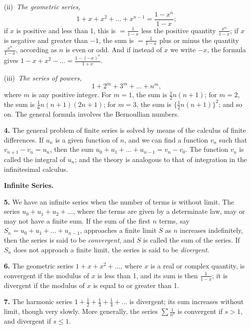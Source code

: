 \documentclass[11pt,a4paper]{book}
\begin{document}
(ii)~\textit{The geometric series,}
\[
1 + x + x^{2} + \ldots + x^{n-1} = \frac{1 - x^{n}}{1 - x};
\]
if $x$ is positive and less than 1, this is $= \frac{1}{1 - x}$ less the positive quantity $\frac{x^{n}}{1 - x}$; if $x$ is negative and greater than $-1$, the sum is $= \frac{1}{1 - x}$ plus or minus the quantity $\frac{x^{n}}{1 - x}$, according as $n$ is even or odd. And if instead of $x$ we write $-x$, the formula gives $1 - x + x^{2} - \ldots = \frac{1 - (-x)^{n}}{1 + x}$.

(iii)~\textit{The series of powers,}
\[
1 + 2^{m} + 3^{m} + \ldots + n^{m},
\]
where $m$ is any positive integer. For $m = 1$, the sum is $\frac{1}{2}n(n + 1)$; for $m = 2$, the sum is $\frac{1}{6}n(n + 1)(2n + 1)$; for $m = 3$, the sum is $\{\frac{1}{2}n(n + 1)\}^{2}$; and so on. The general formula involves the Bernoullian numbers.

\textbf{4.}\quad
The general problem of finite series is solved by means of the calculus of finite differences. If $u_{n}$ is a given function of $n$, and we can find a function $v_{n}$ such that $v_{n+1} - v_{n} = u_{n}$, then the sum $u_{0} + u_{1} + \ldots + u_{n-1} = v_{n} - v_{0}$. The function $v_{n}$ is called the integral of $u_{n}$; and the theory is analogous to that of integration in the infinitesimal calculus.

\bigskip
\noindent\textbf{Infinite Series.}

\smallskip

\textbf{5.}\quad
We have an infinite series when the number of terms is without limit. The series $u_{0} + u_{1} + u_{2} + \ldots$, where the terms are given by a determinate law, may or may not have a finite sum. If the sum of the first $n$ terms, say $S_{n} = u_{0} + u_{1} + \ldots + u_{n-1}$, approaches a finite limit $S$ as $n$ increases indefinitely, then the series is said to be \textit{convergent}, and $S$ is called the sum of the series. If $S_{n}$ does not approach a finite limit, the series is said to be \textit{divergent}.

\textbf{6.}\quad
The geometric series $1 + x + x^{2} + \ldots$, where $x$ is a real or complex quantity, is convergent if the modulus of $x$ is less than 1, and its sum is then $\frac{1}{1 - x}$; it is divergent if the modulus of $x$ is equal to or greater than 1.

\textbf{7.}\quad
The harmonic series $1 + \frac{1}{2} + \frac{1}{3} + \frac{1}{4} + \ldots$ is divergent; its sum increases without limit, though very slowly. More generally, the series $\sum \frac{1}{n^{s}}$ is convergent if $s > 1$, and divergent if $s \leq 1$.
\end{document}
